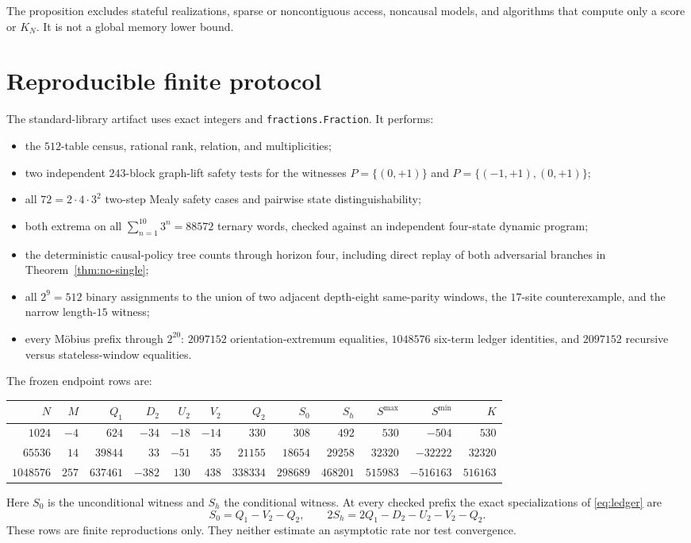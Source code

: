 \documentclass[11pt]{article}
\theoremstyle{definition}
\theoremstyle{remark}
\begin{document}
The proposition excludes stateful realizations, sparse or noncontiguous
access, noncausal models, and algorithms that compute only a score or
$K_N$.  It is not a global memory lower bound.

\section{Reproducible finite protocol}

The standard-library artifact uses exact integers and
\texttt{fractions.Fraction}.  It performs:
\begin{itemize}
\item the $512$-table census, rational rank, relation, and multiplicities;
\item two independent $243$-block graph-lift safety tests for the witnesses
$P=\{(0,+1)\}$ and
$P=\{(-1,+1),(0,+1)\}$;
\item all $72=2\cdot4\cdot3^2$ two-step Mealy safety cases and pairwise state
distinguishability;
\item both extrema on all $\sum_{n=1}^{10}3^n=88572$ ternary words, checked
against an independent four-state dynamic program;
\item the deterministic causal-policy tree counts through horizon four, including direct
replay of both adversarial branches in Theorem~\ref{thm:no-single};
\item all $2^9=512$ binary assignments to the union of two adjacent
depth-eight same-parity windows, the $17$-site counterexample, and the narrow
length-$15$ witness;
\item every M\"obius prefix through $2^{20}$: $2097152$ orientation-extremum
equalities, $1048576$ six-term ledger identities, and $2097152$ recursive
versus stateless-window equalities.
\end{itemize}

The frozen endpoint rows are:
\begin{center}
\begingroup
\setlength{\tabcolsep}{3pt}
\small
\begin{tabular}{rrrrrrrrrrrr}
\toprule
$N$&$M$&$Q_1$&$D_2$&$U_2$&$V_2$&$Q_2$&$S_0$&$S_h$&$S^{\max}$&$S^{\min}$&$K$\\
\midrule
$1024$&$-4$&$624$&$-34$&$-18$&$-14$&$330$&$308$&$492$&$530$&$-504$&$530$\\
$65536$&$14$&$39844$&$33$&$-51$&$35$&$21155$&$18654$&$29258$&$32320$&$-32222$&$32320$\\
$1048576$&$257$&$637461$&$-382$&$130$&$438$&$338334$&$298689$&$468201$&$515983$&$-516163$&$516163$\\
\bottomrule
\end{tabular}
\endgroup
\end{center}
Here $S_0$ is the unconditional witness and $S_h$ the conditional witness.
At every checked prefix the exact specializations of \eqref{eq:ledger} are
\[
 S_0=Q_1-V_2-Q_2,
 \qquad
 2S_h=2Q_1-D_2-U_2-V_2-Q_2.
\]
These rows are finite reproductions only.  They neither estimate an
asymptotic rate nor test convergence.
\end{document}
